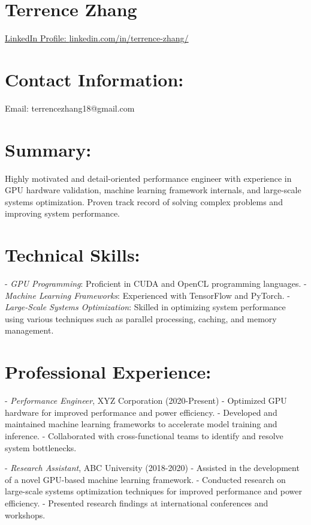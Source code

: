 \documentclass{article}
\begin{document}
\section*{\textbf{Terrence Zhang}}
\href{https://www.linkedin.com/in/terrence-zhang/}{LinkedIn Profile: \href{https://www.linkedin.com/in/terrence-zhang/}{linkedin.com/in/terrence-zhang/}}

\section*{\textbf{Contact Information:}}
Email: terrencezhang18@gmail.com

\section*{\textbf{Summary:}}
Highly motivated and detail-oriented performance engineer with experience in GPU hardware validation, machine learning framework internals, and large-scale systems optimization. Proven track record of solving complex problems and improving system performance.

\section*{\textbf{Technical Skills:}}

- \emph{GPU Programming}: Proficient in CUDA and OpenCL programming languages.
- \emph{Machine Learning Frameworks}: Experienced with TensorFlow and PyTorch.
- \emph{Large-Scale Systems Optimization}: Skilled in optimizing system performance using various techniques such as parallel processing, caching, and memory management.

\section*{\textbf{Professional Experience:}}

- \emph{Performance Engineer}, XYZ Corporation (2020-Present)
  - Optimized GPU hardware for improved performance and power efficiency.
  - Developed and maintained machine learning frameworks to accelerate model training and inference.
  - Collaborated with cross-functional teams to identify and resolve system bottlenecks.

- \emph{Research Assistant}, ABC University (2018-2020)
  - Assisted in the development of a novel GPU-based machine learning framework.
  - Conducted research on large-scale systems optimization techniques for improved performance and power efficiency.
  - Presented research findings at international conferences and workshops.
\end{document}
